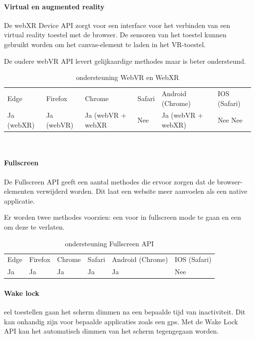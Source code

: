 \paragraph{Virtual en augmented reality }
De webXR Device API \autocite{Jones2020} zorgt voor een interface voor het verbinden van een virtual reality toestel met de browser. De sensoren van het toestel kunnen gebruikt worden om het canvas-element te laden in het VR-toestel.

De oudere webVR API levert gelijkaardige methodes maar is beter ondersteund.

\begin{table}[H]
	\centering
	\begin{tabular}{llllll}
		Edge & Firefox & Chrome & Safari & Android (Chrome) & IOS (Safari) \\
		Ja (webXR)  & 	Ja (webVR)  &  	Ja (webVR + webXR  & Nee  & Ja (webVR + webXR) & Nee Nee          
	\end{tabular}	
	\caption{ondersteuning  WebVR en WebXR  }
	\label{ondersteuning  WebVR en WebXR }
\end{table}\

\paragraph{Fullscreen }
De Fullscreen API \autocite{Kesteren2020} geeft een aantal methodes die ervoor zorgen dat de browser-elementen verwijderd worden. Dit laat een website meer aanvoelen als een native applicatie.

Er worden twee methodes voorzien: een voor in fullscreen mode te gaan en een om deze te verlaten.

\begin{table}[H]
	\begin{tabular}{llllll}
		Edge & Firefox & Chrome & Safari & Android (Chrome) & IOS (Safari) \\
		Ja   & Ja      &  Ja   & Ja     & Ja               & Nee          
	\end{tabular}	
	\caption{ondersteuning  Fullscreen API  }
	\label{ondersteuning  Fullscreen API }
\end{table}


\paragraph{Wake lock }
eel toestellen gaan het scherm dimmen na een bepaalde tijd van inactiviteit. Dit kan onhandig zijn voor bepaalde applicaties zoals een gps. Met de Wake Lock API \autocite{Bogdanovich2020} kan het automatisch dimmen van het scherm tegengegaan worden.

